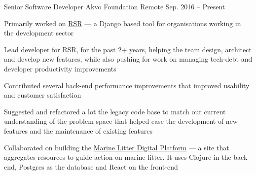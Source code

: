 

\begin{cventries}

  \cventry
      {Senior Software Developer} %
      {Akvo Foundation } %
      {Remote} %
      {Sep. 2016 -- Present} %
      {
        \begin{cvitems} %
        \item {Primarily worked on \href{https://github.com/akvo/akvo-rsr}{RSR} --- a Django based tool for organisations working in the development sector}
        \item {Lead developer for RSR, for the past 2+ years, helping the team design, architect and develop new features, while also pushing for work on managing tech-debt and developer productivity improvements}
        \item {Contributed several back-end performance improvements that improved usability and customer satisfaction}
        \item {Suggested and refactored a lot the legacy code base to match our current understanding of the problem space that helped ease the development of new features and the maintenance of existing features}
        \item {Collaborated on building the \href{https://digital.gpmarinelitter.org/}{Marine Litter Digital Platform} --- a site that aggregates resources to guide action on marine litter. It uses Clojure in the back-end, Postgres as the database and React on the front-end}
        \end{cvitems}
      }


\end{cventries}
